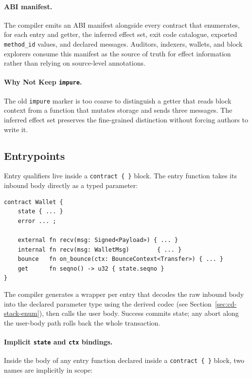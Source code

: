 \documentclass[12pt,oneside]{article}
\begin{document}
\paragraph{ABI manifest.}
The compiler emits an ABI manifest alongside every contract that
enumerates, for each entry and getter, the inferred effect set, exit
code catalogue, exported \verb|method_id| values, and declared
messages. Auditors, indexers, wallets, and block explorers consume
this manifest as the source of truth for effect information rather
than relying on source-level annotations.

\paragraph{Why Not Keep \texttt{impure}.}
The old \verb|impure| marker is too coarse to distinguish a getter
that reads block context from a function that mutates storage and
sends three messages. The inferred effect set preserves the
fine-grained distinction without forcing authors to write it.

\subsection{Entrypoints}
\label{sec:entrypoints}
Entry qualifiers live inside a \verb|contract { }| block. The entry
function takes its inbound body directly as a typed parameter:

\begin{verbatim}
contract Wallet {
    state { ... }
    error ... ;

    external fn recv(msg: Signed<Payload>) { ... }
    internal fn recv(msg: WalletMsg)        { ... }
    bounce   fn on_bounce(ctx: BounceContext<Transfer>) { ... }
    get      fn seqno() -> u32 { state.seqno }
}
\end{verbatim}

The compiler generates a wrapper per entry that decodes the raw
inbound body into the declared parameter type using the derived codec
(see Section~\ref{sec:cd-stack-enum}), then calls the user body.
Success commits state; any abort along the user-body path rolls back
the whole transaction.

\paragraph{Implicit \texttt{state} and \texttt{ctx} bindings.}
Inside the body of any entry function declared inside a
\verb|contract { }| block, two names are implicitly in scope:
\end{document}
